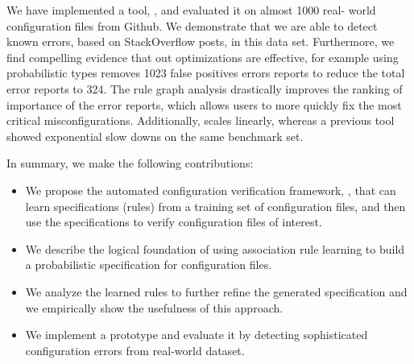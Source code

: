 We have implemented a tool, \app, and evaluated it on almost 1000 real-
world configuration files from Github.
We demonstrate that we are able to detect known errors, based on 
StackOverflow posts, in this data set.
Furthermore, we find compelling evidence that out optimizations are 
effective, for example using probabilistic types removes 1023 false 
positives errors reports to reduce the total error reports to 324.
The rule graph analysis drastically improves the ranking of importance of 
the error reports, which allows users to more quickly fix the most 
critical misconfigurations.
Additionally, \app scales linearly, whereas 
a previous tool~\cite{santolucitoCAV} showed exponential slow downs on 
the same benchmark set.

In summary, we make the following contributions:
\begin{itemize}
\item We propose the automated configuration verification
framework, \app, that can learn specifications (rules) from a training set
of configuration files, and then use the specifications to verify 
configuration files of interest.
\item We describe the logical foundation of using association rule learning to build a probabilistic specification for configuration files. 
\item We analyze the learned rules to further refine the generated specification and we empirically show the usefulness of this approach.
\item We implement a \app prototype and evaluate it by
detecting sophisticated configuration errors 
from real-world dataset.

\end{itemize}


